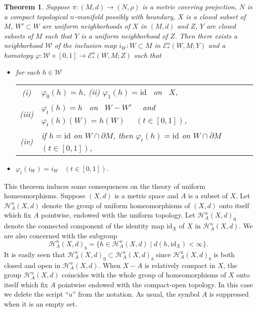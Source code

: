 \documentclass[11pt, fleqn]{amsart}
\newtheorem{theorem}{Theorem}[section]
\theoremstyle{definition}
\newcommand{\cal}{\mathcal}
\renewcommand{\phi}{\varphi}
\newcommand{\lra}{\longrightarrow}
\newcommand{\id}{\mathrm{id}}
\newcommand{\E}{\mathcal E}
\newcommand{\W}{\mathcal W}
\begin{document}
\begin{theorem}\label{thm_local_deformation} 
Suppose $\pi : (M, d) \to (N, \rho)$ is a metric covering projection, $N$ is a compact topological $n$-manifold possibly with boundary,  
$X$ is a closed subset of $M$, $W' \subset W$ are uniform neighborhoods of $X$ in $(M, d)$ and 
$Z$, $Y$ are closed subsets of $M$ such that $Y$ is a uniform neighborhood of $Z$. 
Then there exists a neighborhood $\W$ of the inclusion map $i_W : W \subset M$ in $\E^u_\ast(W, M; Y)$ and 
a homotopy $\phi : \W \times [0,1] \lra \E^u_\ast(W, M; Z)$ such that 
\begin{itemize} 
\item[(1)] for each $h \in \W$ \\ 
\begin{tabular}[t]{c@{\ \,}l}
{\rm (i)} & $\phi_0(h) = h$, \hspace{3mm} 
{\rm (ii)} $\phi_1(h) = \id$ \ on \ $X$, \\[2mm] 
{\rm (iii)} & $\phi_t(h) = h$ \ on \ $W - W'$ \ \ and \ \ $\phi_t(h)(W) = h(W)$ \ \ $(t \in [0,1])$, \\[2mm] 
{\rm (iv)} & if $h = \id$ on $W \cap \partial M$, then $\phi_t(h) = \id$ on $W \cap \partial M$ $(t \in [0,1])$, 
\end{tabular} 
\vskip 1.5mm 
\item[(2)] $\phi_t(i_W) = i_W$ \ $(t \in [0,1])$.
\end{itemize} 
\end{theorem}

This theorem induces some consequences on the theory of uniform homeomorphisms. 
Suppose $(X,d)$ is a metric space and $A$ is a subset of $X$. 
Let ${\cal H}^u_A(X,d)$ denote the group of uniform homeomorphisms of $(X, d)$ onto itself which fix $A$ pointwise, 
endowed with the uniform topology. 
Let ${\cal H}^u_A(X, d)_0$ denote the connected component of the identity map $\id_X$ of $X$ in ${\cal H}_A^u(X, d)$. 
We are also concerned with the subgroup 
$${\cal H}^u_A(X, d)_b = \{ h \in {\cal H}_A^u(X, d) \mid d(h, \id_X) < \infty \}.$$ 
It is easily seen that ${\cal H}^u_A(X, d)_0 \subset {\cal H}^u_A(X, d)_b$ since ${\cal H}^u_A(X, d)_b$ is both closed and open in ${\cal H}^u_A(X, d)$. 
When $X - A$ is relatively compact in $X$, the group  
${\cal H}^u_A(X,d)$ coincides with the whole group of homeomorphisms of $X$ onto itself which fix $A$ pointwise endowed with the compact-open topology. 
In this case we delete the script ``$u$'' from the notation. As usual, the symbol $A$ is suppressed when it is an empty set. 
\end{document}
